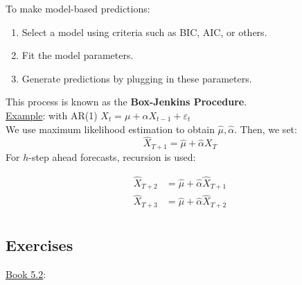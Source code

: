 To make model-based predictions:
\begin{enumerate}
    \item Select a model using criteria such as BIC, AIC, or others.
    \item Fit the model parameters.
    \item Generate predictions by plugging in these parameters.
\end{enumerate}
This process is known as the \textbf{Box-Jenkins Procedure}. \\

\underline{Example}: with AR(1) $X_t=\mu+\alpha X_{t-1}+\varepsilon_t$ \\

We use maximum likelihood estimation to obtain $\hat{\mu}, \hat{\alpha}$. Then, we set: \[\hat{X}_{T+1}=\hat{\mu}+\hat{\alpha} X_T\]
For $h$-step ahead forecasts, recursion is used: 

        \begin{align*}
            \hat{X}_{T+2} &= \hat{\mu} +\hat{\alpha} \hat{X}_{T+1}\\
            \hat{X}_{T+3} &= \hat{\mu} +\hat{\alpha} \hat{X}_{T+2}\\
        \end{align*}

\subsection{Exercises}

\underline{Book 5.2}: \\

